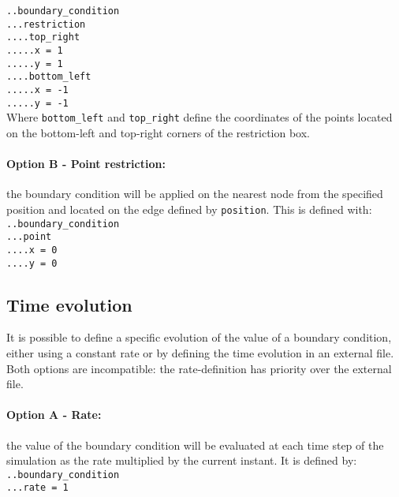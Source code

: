 \documentclass[10pt]{article}
\begin{document}
\noindent \verb+..boundary_condition+\\
\verb+...restriction+\\
\verb+....top_right+\\
\verb+.....x = 1+\\
\verb+.....y = 1+\\
\verb+....bottom_left+\\
\verb+.....x = -1+\\
\verb+.....y = -1+\\

Where \verb+bottom_left+ and \verb+top_right+ define the coordinates of the points located on the bottom-left and top-right corners of the restriction box.

\paragraph{Option B - Point restriction:} the boundary condition will be applied on the nearest node from the specified position and located on the edge defined by \verb+position+.
This is defined with:\\

\noindent \verb+..boundary_condition+\\
\verb+...point+\\
\verb+....x = 0+\\
\verb+....y = 0+\\

\subsection{Time evolution}

It is possible to define a specific evolution of the value of a boundary condition, either using a constant rate or by defining the time evolution in an external file.
Both options are incompatible: the rate-definition has priority over the external file.

\paragraph{Option A - Rate:} the value of the boundary condition will be evaluated at each time step of the simulation as the rate multiplied by the current instant.
It is defined by:\\

\noindent \verb+..boundary_condition+\\
\verb+...rate = 1+\\
\end{document}
